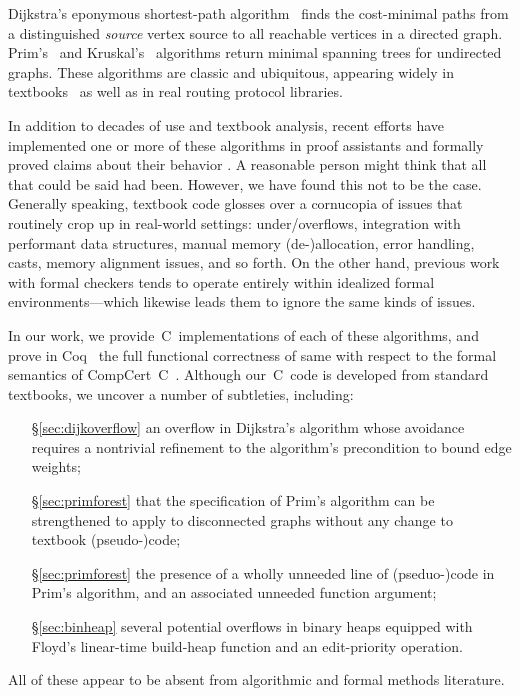 Dijkstra's eponymous shortest-path algorithm~\cite{DBLP:journals/nm/Dijkstra59} finds
the cost-minimal paths from a distinguished \emph{source} vertex
source to all reachable vertices in a directed graph. Prim's~\cite{prim} and Kruskal's~\cite{kruskal} algorithms return minimal spanning trees for undirected graphs.
These algorithms are classic and ubiquitous, appearing widely in textbooks~\cite{clrs,DBLP:books/daglib/0022194,heineman2008algorithms,rozen,kepnergilbert,sedgewick} as well as in real routing protocol libraries.

In addition to decades of use and textbook analysis, recent efforts have implemented one or more of these algorithms in proof
assistants and formally proved claims about their behavior \cite{Mizar,ACL2,Coq,cite,cite,cite}.  A reasonable person might think that all
that could be said had been.  However, we have found this not to be the case.  Generally speaking, textbook code glosses over a cornucopia
of issues that routinely crop up in real-world settings: under/overflows, integration with performant data structures, manual memory (de-)allocation,
error handling, casts, memory alignment issues, and so forth.  On the other hand, previous work with formal checkers tends to operate entirely
within idealized formal environments---which likewise leads them to ignore the same kinds of issues.

In our work, we provide~C~implementations of each of these algorithms, and prove in Coq~\cite{Coq} the full functional correctness of same with respect to
the formal semantics of CompCert~C~\cite{leroy:compcert}.  Although our~C~code is developed from standard textbooks, we uncover a number of subtleties, including:
\begin{itemize}
\item[\S\ref{sec:dijkoverflow}] an overflow in Dijkstra's algorithm whose avoidance requires a nontrivial refinement to the algorithm's precondition to bound edge weights;
\item[\S\ref{sec:primforest}] that the specification of Prim's algorithm can be strengthened to apply to disconnected graphs without any change to textbook (pseudo-)code;
\item[\S\ref{sec:primforest}] the presence of a wholly unneeded line of (pseduo-)code in Prim's algorithm, and an associated unneeded function argument;
\item[\S\ref{sec:binheap}] several potential overflows in binary heaps equipped with Floyd's linear-time build-heap function and an edit-priority operation.
\end{itemize}
All of these appear to be absent from algorithmic and formal methods literature.

